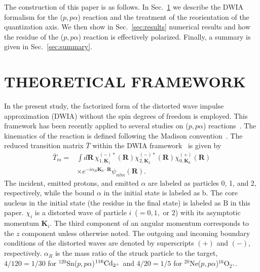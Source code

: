 \documentclass[%
 reprint,
superscriptaddress,
 amsmath,amssymb,
 aps,
]{revtex4-2}
\begin{document}
The construction of this paper is as follows. 
In Sec.~\ref{sec:framework} we describe the DWIA formalism for the ($p,p\alpha$) reaction and the treatment of the reorientation of the quantization axis. We then show in Sec.~\ref{sec:results} 
numerical results and how the residue of the ($p,p\alpha$) reaction is effectively polarized. Finally, a summary is given in Sec.~\ref{sec:summary}.


\section{THEORETICAL FRAMEWORK}\label{sec:framework}

In the present study, the factorized form of the distorted wave impulse approximation (DWIA)
without the spin degrees of freedom is employed.
This framework has been recently applied to several studies on ($p,p\alpha$) 
reactions~\cite{Yoshida16,Lyu18,Lyu19,Yoshida19,Taniguchi_48Ti}.
The kinematics of the reaction is defined following  
the Madison convention~\cite{madison_convention}. 
The reduced transition matrix $\bar{T}$ within the DWIA
framework~\cite{Wakasa17,Chant77,Chant83}
is given by
\begin{align}
\bar{T}_{m}
=&
\int d\bm{R}\,
\chi_{1,\bm{K}_1}^{(-)*}(\bm{R})
\chi_{2,\bm{K}_2}^{(-)*}(\bm{R})
\chi_{0,\bm{K}_0}^{(+)}(\bm{R}) \nonumber \\
& \times e^{-i\alpha_{R}\bm{K}_0 \cdot\bm{R}}
\psi_{nlm}(\bm{R}).
\label{eq:tmatrix}
\end{align}
The incident, emitted protons, and emitted $\alpha$ are labeled as particles 0, 1, and 2, respectively,
while the bound $\alpha$ in the initial state is labeled as b.
The core nucleus in the initial state (the residue in the final state) is labeled as $\mathrm{B}$
in this paper.
$\chi_{i}$ is a distorted wave of particle $i$~($=0,1,$ or $2$) with its asymptotic momentum $\bm{K}_i$.
The third component of an angular momentum corresponds to the $z$ component unless otherwise noted.
The outgoing and incoming boundary conditions of the distorted waves 
are denoted by superscripts $(+)$ and $(-)$, respectively.
$\alpha_{R}$ is the mass ratio of the struck particle to the target, $4/120=1/30$ for $^{120}$Sn($p,p\alpha$)$^{116}{\rm Cd}_{2^+}$ and $4/20=1/5$ for $^{20}$Ne($p,p\alpha$)$^{16}\mathrm{O}_{2^+}$.
\end{document}
